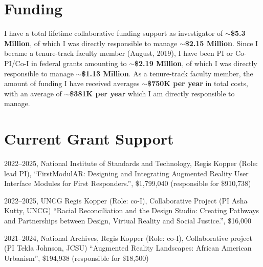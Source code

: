 \documentclass[wideaddress]{vitae}
\begin{document}
\section{Funding}
    I have a total lifetime collaborative funding support as investigator of \textbf{$\sim$\$5.3 Million}, of which I was directly responsible to manage \textbf{$\sim$\$2.15 Million}. Since I became a tenure-track faculty member (August, 2019), I have been PI or Co-PI/Co-I in federal grants amounting to \textbf{$\sim$\$2.19 Million}, of which I was directly responsible to manage \textbf{$\sim$\$1.13 Million}. As a tenure-track faculty member, the amount of funding I have received averages \textbf{$\sim$\$750K per year} in total costs, with an average of \textbf{$\sim$\$381K per year} which I am directly responsible to manage.%

\section{Current Grant Support}
\begin{etaremune}
	\item{2022--2025, National Institute of Standards and Technology, Regis Kopper (Role: lead PI), ``FirstModulAR: Designing and Integrating Augmented Reality User Interface Modules for First Responders.'', \$1,799,040 (responsible for \$910,738)}
	\item{2022--2025, UNCG Regis Kopper (Role: co-I), Collaborative Project (PI Asha Kutty, UNCG) ``Racial Reconciliation and the Design Studio: Creating Pathways and Partnerships between Design, Virtual Reality and Social Justice.'', \$16,000}
	\item{2021--2024, National Archives, Regis Kopper (Role: co-I), Collaborative project (PI Tekla Johnson, JCSU) ``Augmented Reality Landscapes: African American Urbanism'', \$194,938 (responsible for \$18,500)}
\end{etaremune}
\end{document}
